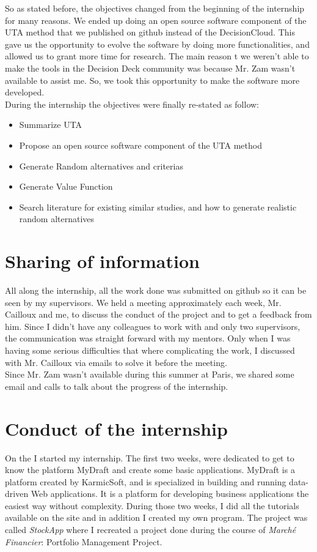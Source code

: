 \documentclass{report}
\begin{document}
So as stated before, the objectives changed from the beginning of the internship for many reasons. We ended up doing an open source software component of the UTA method that we published on github instead of the DecisionCloud. This gave us the opportunity to evolve the software by doing more functionalities, and allowed us to grant more time for research. The main reason t we weren't able to make the tools in the Decision Deck community was because Mr. Zam wasn't available to assist me. So, we took this opportunity to make the software more developed.\\
During the internship the objectives were finally re-stated as follow: 
\begin{itemize}
\item Summarize UTA
\item Propose an open source software component of the UTA method
\item Generate Random alternatives and criterias
\item Generate Value Function
\item Search literature for existing similar studies, and how to generate realistic random alternatives
\end{itemize}

\section{Sharing of information}
All along the internship, all the work done was submitted on github so it can be seen by my supervisors. We held a meeting approximately each week, Mr. Cailloux and me, to discuss the conduct of the project and to get a feedback from him. Since I didn't have any colleagues to work with and only two supervisors, the communication was straight forward with my mentors. Only when I was having some serious difficulties that where complicating the work, I discussed with Mr. Cailloux via emails to solve it before the meeting. \\
Since Mr. Zam wasn't available during this summer at Paris, we shared some email and calls to talk about the progress of the internship. 

\section{Conduct of the internship}
On the  I started my internship. The first two weeks, were dedicated to get to know the platform MyDraft and create some basic applications. MyDraft is a platform created by KarmicSoft, and is  specialized in building and running data-driven Web applications. It is a platform for developing business applications the easiest way without complexity. During those two weeks, I did all the tutorials available on the site and in addition I created my own program. The project was called \textit{StockApp} where I recreated a project done during the course of \textit{Marché Financier}: Portfolio Management Project.\\
\end{document}
